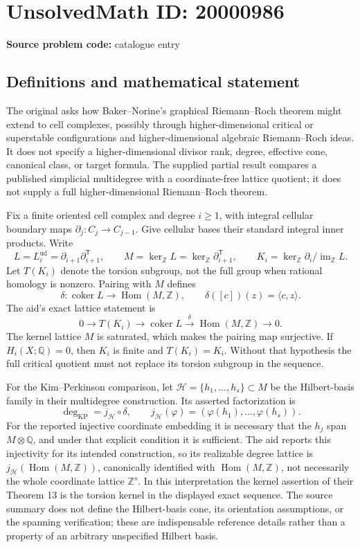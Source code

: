 \documentclass[11pt]{article}
\newcommand{\Z}{\mathbb{Z}}
\newcommand{\Q}{\mathbb{Q}}
\begin{document}
\section*{UnsolvedMath ID: 20000986}
\textbf{Source problem code:} catalogue entry
\subsection{Definitions and mathematical statement}
The original asks how Baker--Norine's graphical Riemann--Roch theorem might extend to cell complexes, possibly through higher-dimensional critical or superstable configurations and higher-dimensional algebraic Riemann--Roch ideas. It does not specify a higher-dimensional divisor rank, degree, effective cone, canonical class, or target formula. The supplied partial result compares a published simplicial multidegree with a coordinate-free lattice quotient; it does not supply a full higher-dimensional Riemann--Roch theorem.

Fix a finite oriented cell complex and degree \(i\geq1\), with integral cellular boundary maps \(\partial_j:C_j\to C_{j-1}\). Give cellular bases their standard integral inner products. Write
\[
 L=L_i^{\mathrm{ud}}=\partial_{i+1}\partial_{i+1}^{\mathsf T},\qquad
 M=\ker_\Z L=\ker_\Z\partial_{i+1}^{\mathsf T},\qquad
 K_i=\ker_\Z\partial_i/\operatorname{im}_\Z L.
\]
Let \(T(K_i)\) denote the torsion subgroup, not the full group when rational homology is nonzero. Pairing with \(M\) defines
\[
 \delta:\operatorname{coker}L\to\operatorname{Hom}(M,\Z),\qquad
 \delta([c])(z)=\langle c,z\rangle.
\]
The aid's exact lattice statement is
\[
 0\longrightarrow T(K_i)\longrightarrow\operatorname{coker}L
 \xrightarrow{\delta}\operatorname{Hom}(M,\Z)\longrightarrow0.
\]
The kernel lattice \(M\) is saturated, which makes the pairing map surjective. If \(H_i(X;\Q)=0\), then \(K_i\) is finite and \(T(K_i)=K_i\). Without that hypothesis the full critical quotient must not replace its torsion subgroup in the sequence.

For the Kim--Perkinson comparison, let \(\mathcal H=\{h_1,\ldots,h_s\}\subset M\) be the Hilbert-basis family in their multidegree construction. Its asserted factorization is
\[
 \deg_{\mathrm{KP}}=j_{\mathcal H}\circ\delta,\qquad
 j_{\mathcal H}(\varphi)=(\varphi(h_1),\ldots,\varphi(h_s)).
\]
For the reported injective coordinate embedding it is necessary that the \(h_j\) span \(M\otimes\Q\), and under that explicit condition it is sufficient. The aid reports this injectivity for its intended construction, so its realizable degree lattice is \(j_{\mathcal H}(\operatorname{Hom}(M,\Z))\), canonically identified with \(\operatorname{Hom}(M,\Z)\), not necessarily the whole coordinate lattice \(\Z^s\). In this interpretation the kernel assertion of their Theorem 13 is the torsion kernel in the displayed exact sequence. The source summary does not define the Hilbert-basis cone, its orientation assumptions, or the spanning verification; these are indispensable reference details rather than a property of an arbitrary unspecified Hilbert basis.
\end{document}
